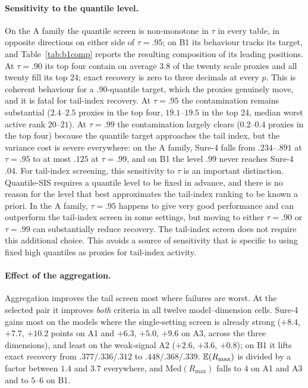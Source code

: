 \paragraph{Sensitivity to the quantile level.}
On the A family the quantile screen is non-monotone in $\tau$ in every
table, in opposite directions on either side of $\tau=.95$; on B1 its
behaviour tracks its target, and Table~\ref{tab:b1comp} reports the
resulting composition of its leading positions. At $\tau=.90$ its top
four contain on average $3.8$ of the twenty scale proxies and all
twenty fill its top 24; exact recovery is zero to three decimals at
every $p$. This is coherent behaviour for a $.90$-quantile target,
which the proxies genuinely move, and it is fatal for tail-index
recovery. At $\tau=.95$ the contamination remains substantial
($2.4$--$2.5$ proxies in the top four, $19.1$--$19.5$ in the top 24,
median worst active rank $20$--$21$). At $\tau=.99$ the contamination
largely clears ($0.2$--$0.4$ proxies in the top four) because the
quantile target approaches the tail index, but the variance cost is
severe everywhere: on the A family, Sure-4 falls from $.234$--$.891$
at $\tau=.95$ to at most $.125$ at $\tau=.99$, and on B1 the level
$.99$ never reaches Sure-4 $.04$. For tail-index screening, this sensitivity to $\tau$ is an important
distinction. Quantile-SIS requires a quantile level to be fixed in
advance, and there is no reason for the level that best approximates the
tail-index ranking to be known a priori. In the A family, $\tau=.95$
happens to give very good performance and can outperform the tail-index
screen in some settings, but moving to either $\tau=.90$ or $\tau=.99$
can substantially reduce recovery. The tail-index screen does not require
this additional choice. This avoids a
source of sensitivity that is specific to using fixed high quantiles as
proxies for tail-index activity.

\paragraph{Effect of the aggregation.}
Aggregation improves the tail screen most where failures are worst. At the
selected pair it improves \emph{both} criteria in all twelve
model--dimension cells. Sure-4 gains most on the models where the
single-setting screen is already strong ($+8.4$, $+7.7$, $+10.2$ points
on A1 and $+6.3$, $+5.0$, $+9.6$ on A3, across the three dimensions),
and least on the weak-signal A2 ($+2.6$, $+3.6$, $+0.8$); on B1 it
lifts exact recovery from $.377/.336/.312$ to $.448/.368/.339$.
$\mathbb E(R_{\max})$ is divided by a factor between $1.4$ and $3.7$
everywhere, and $\mathrm{Med}(R_{\max})$ falls to $4$ on A1 and A3 and
to $5$--$6$ on B1.

